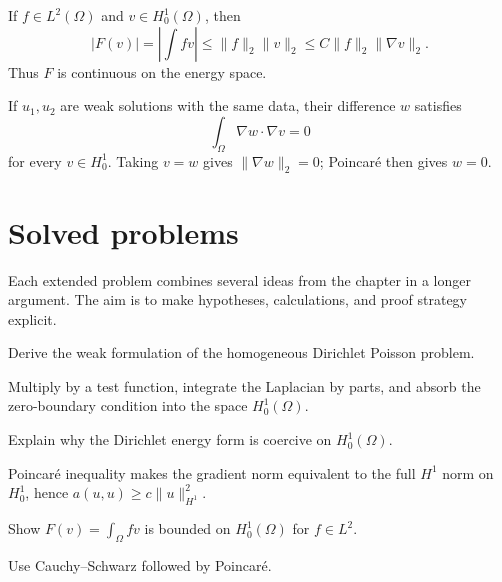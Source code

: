 \begin{example}\label{ex:iii23-worked-03}
If \(f\in L^2(\Omega)\) and \(v\in H_0^1(\Omega)\), then
\[
|F(v)|=\left|\int fv\right|
\le\|f\|_2\|v\|_2
\le C\|f\|_2\|\nabla v\|_2.
\]
Thus \(F\) is continuous on the energy space.
\end{example}

\begin{example}\label{ex:iii23-worked-04}
If \(u_1,u_2\) are weak solutions with the same data, their difference
\(w\) satisfies
\[
\int_\Omega\nabla w\cdot\nabla v=0
\]
for every \(v\in H_0^1\). Taking \(v=w\) gives \(\|\nabla w\|_2=0\); Poincaré
then gives \(w=0\).
\end{example}

\section{Solved problems}
Each extended problem combines several ideas from the chapter in a longer argument. The aim is to make hypotheses, calculations, and proof strategy explicit.

\begin{problem}\label{prob:iii23-problem-01}
Derive the weak formulation of the homogeneous Dirichlet Poisson problem.
\end{problem}
\begin{solution}
Multiply by a test function, integrate the Laplacian by parts, and absorb
the zero-boundary condition into the space \(H_0^1(\Omega)\).
\end{solution}

\begin{problem}\label{prob:iii23-problem-02}
Explain why the Dirichlet energy form is coercive on \(H_0^1(\Omega)\).
\end{problem}
\begin{solution}
Poincaré inequality makes the gradient norm equivalent to the full
\(H^1\) norm on \(H_0^1\), hence
\(a(u,u)\ge c\|u\|_{H^1}^2\).
\end{solution}

\begin{problem}\label{prob:iii23-problem-03}
Show \(F(v)=\int_\Omega fv\) is bounded on \(H_0^1(\Omega)\) for \(f\in L^2\).
\end{problem}
\begin{solution}
Use Cauchy--Schwarz followed by Poincaré.
\end{solution}

